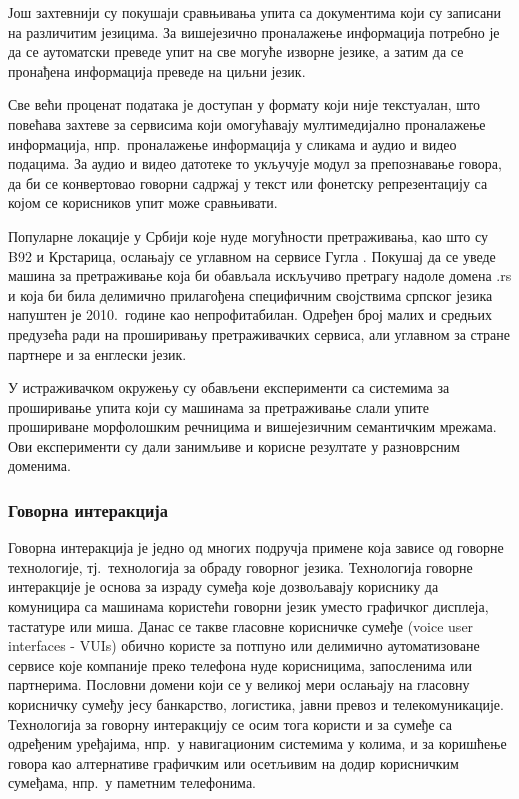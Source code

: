 \begin{multicols}{2}
Још захтевнији су покушаји сравњивања упита са документима који су записани на различитим језицима. За вишејезично проналажење информација потребно је да се аутоматски преведе упит на све могуће изворне језике, а затим да се пронађена информација преведе на циљни језик. 

Све већи проценат података је доступан у формату који није текстуалан, што повећава захтеве за сервисима који омогућавају мултимедијално проналажење информација, нпр.~проналажење информација у сликама и аудио и видео подацима. За аудио и видео датотеке то укључује модул за препознавање говора, да би се конвертовао говорни садржај у текст или фонетску репрезентацију са којом се корисников упит може сравњивати. 

Популарне локације у Србији које нуде могућности претраживања, као што су B92 и Крстарица, ослањају се углавном на сервисе Гугла \cite{ALEXA}. Покушај да се уведе машина за претраживање која би обављала искључиво претрагу надоле домена .rs и која би била делимично прилагођена специфичним својствима српског језика напуштен је 2010.~године као непрофитабилан. Одређен број малих и средњих предузећа ради на проширивању претраживачких сервиса, али углавном за стране партнере и за енглески језик. 

У истраживачком окружењу су обављени експерименти са системима за проширивање упита који су машинама за претраживање слали упите прошириване морфолошким речницима и вишејезичним семантичким мрежама. Ови експерименти су дали занимљиве и корисне резултате у разноврсним доменима. 

 \subsubsection {Говорна интеракција}
   
Говорна интеракција је једно од многих подручја примене која зависе од говорне технологије, тј.~технологија за обраду говорног језика. Технологија говорне интеракције је основа за израду сумеђа  које дозвољавају кориснику да комуницира са машинама користећи говорни језик уместо графичког дисплеја, тастатуре или миша. Данас се такве гласовне корисничке сумеђе (voice user interfaces - VUIs) обично користе за потпуно или делимично аутоматизоване сервисе које компаније преко телефона нуде корисницима, запосленима или партнерима. Пословни домени који се у великој мери ослањају на гласовну корисничку сумеђу јесу банкарство, логистика, јавни превоз и телекомуникације. Технологија за говорну интеракцију се осим тога користи и за сумеђе са одређеним уређајима, нпр.~у навигационим системима у колима, и за коришћење говора као алтернативе графичким или осетљивим на додир корисничким сумеђама, нпр.~у паметним телефонима. 


\end{multicols}
